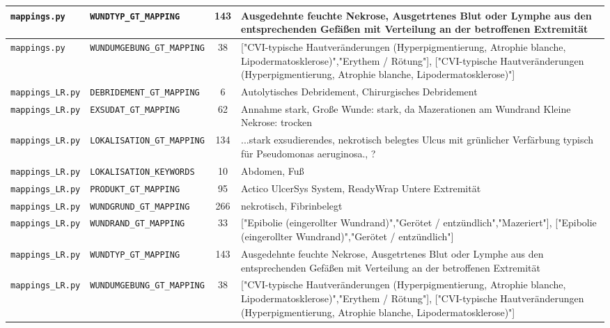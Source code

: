 \begin{table}[h!]
\begin{tabular}{|l|l|c|p{6cm}|}
\texttt{mappings.py} & \texttt{WUNDTYP\_GT\_MAPPING} & 143 & \small{Ausgedehnte feuchte Nekrose, Ausgetrtenes Blut oder Lymphe aus den entsprechenden Gefäßen mit Verteilung an der betroffenen Extremität} \\ \hline
\texttt{mappings.py} & \texttt{WUNDUMGEBUNG\_GT\_MAPPING} & 38 & \small{["CVI-typische Hautveränderungen (Hyperpigmentierung, Atrophie blanche, Lipodermatosklerose)","Erythem / Rötung"], ["CVI-typische Hautveränderungen (Hyperpigmentierung, Atrophie blanche, Lipodermatosklerose)"]} \\ \hline
\texttt{mappings\_LR.py} & \texttt{DEBRIDEMENT\_GT\_MAPPING} & 6 & \small{Autolytisches Debridement, Chirurgisches Debridement} \\ \hline
\texttt{mappings\_LR.py} & \texttt{EXSUDAT\_GT\_MAPPING} & 62 & \small{Annahme stark, Große Wunde: stark, da Mazerationen am Wundrand
Kleine Nekrose: trocken} \\ \hline
\texttt{mappings\_LR.py} & \texttt{LOKALISATION\_GT\_MAPPING} & 134 & \small{...stark exsudierendes, nekrotisch belegtes Ulcus mit grünlicher Verfärbung typisch für Pseudomonas aeruginosa., ?} \\ \hline
\texttt{mappings\_LR.py} & \texttt{LOKALISATION\_KEYWORDS} & 10 & \small{Abdomen, Fuß} \\ \hline
\texttt{mappings\_LR.py} & \texttt{PRODUKT\_GT\_MAPPING} & 95 & \small{Actico UlcerSys System, ReadyWrap Untere Extremität} \\ \hline
\texttt{mappings\_LR.py} & \texttt{WUNDGRUND\_GT\_MAPPING} & 266 & \small{nekrotisch, Fibrinbelegt} \\ \hline
\texttt{mappings\_LR.py} & \texttt{WUNDRAND\_GT\_MAPPING} & 33 & \small{["Epibolie (eingerollter Wundrand)","Gerötet / entzündlich","Mazeriert"], ["Epibolie (eingerollter Wundrand)","Gerötet / entzündlich"]} \\ \hline
\texttt{mappings\_LR.py} & \texttt{WUNDTYP\_GT\_MAPPING} & 143 & \small{Ausgedehnte feuchte Nekrose, Ausgetrtenes Blut oder Lymphe aus den entsprechenden Gefäßen mit Verteilung an der betroffenen Extremität} \\ \hline
\texttt{mappings\_LR.py} & \texttt{WUNDUMGEBUNG\_GT\_MAPPING} & 38 & \small{["CVI-typische Hautveränderungen (Hyperpigmentierung, Atrophie blanche, Lipodermatosklerose)","Erythem / Rötung"], ["CVI-typische Hautveränderungen (Hyperpigmentierung, Atrophie blanche, Lipodermatosklerose)"]} \\ \hline
\end{tabular}
\end{table}